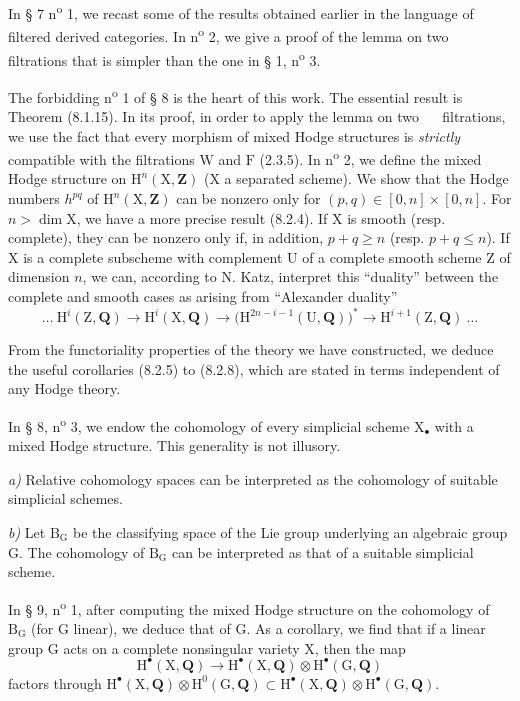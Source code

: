 \documentclass[11pt,leqno]{article}
\newcommand{\Page}[1]{\ifvmode\noindent\else\unskip\ \fi{\footnotesize\textcolor{gray}{[p.\,#1]}}\ \ignorespaces}
\begin{document}
In § 7 n\textsuperscript{o} 1, we recast some of the results obtained earlier in the language of filtered derived categories. In n\textsuperscript{o} 2, we give a proof of the lemma on two filtrations that is simpler than the one in § 1, n\textsuperscript{o} 3.

The forbidding n\textsuperscript{o} 1 of § 8 is the heart of this work. The essential result is Theorem (8.1.15). In its proof, in order to apply the lemma on two
\Page{7}
filtrations, we use the fact that every morphism of mixed Hodge structures is \textit{strictly} compatible with the filtrations \(\mathrm{W}\) and \(\mathrm{F}\) (2.3.5). In n\textsuperscript{o} 2, we define the mixed Hodge structure on \(\mathrm{H}^n(\mathrm{X},\mathbf{Z})\) (\(\mathrm{X}\) a separated scheme). We show that the Hodge numbers \(h^{pq}\) of \(\mathrm{H}^n(\mathrm{X},\mathbf{Z})\) can be nonzero only for \((p,q)\in[0,n]\times[0,n]\). For \(n>\dim\mathrm{X}\), we have a more precise result (8.2.4). If \(\mathrm{X}\) is smooth (resp. complete), they can be nonzero only if, in addition, \(p+q\geq n\) (resp. \(p+q\leq n\)). If \(\mathrm{X}\) is a complete subscheme with complement \(\mathrm{U}\) of a complete smooth scheme \(\mathrm{Z}\) of dimension \(n\), we can, according to N. Katz, interpret this “duality” between the complete and smooth cases as arising from “Alexander duality”
\[
\ldots\ \mathrm{H}^i(\mathrm{Z},\mathbf{Q})
\to \mathrm{H}^i(\mathrm{X},\mathbf{Q})
\to \bigl(\mathrm{H}^{2n-i-1}(\mathrm{U},\mathbf{Q})\bigr)^*
\to \mathrm{H}^{i+1}(\mathrm{Z},\mathbf{Q})\ \ldots
\]

From the functoriality properties of the theory we have constructed, we deduce the useful corollaries (8.2.5) to (8.2.8), which are stated in terms independent of any Hodge theory.

In § 8, n\textsuperscript{o} 3, we endow the cohomology of every simplicial scheme \(\mathrm{X}_{\bullet}\) with a mixed Hodge structure. This generality is not illusory.

\textit{a)} Relative cohomology spaces can be interpreted as the cohomology of suitable simplicial schemes.

\textit{b)} Let \(\mathrm{B}_{\mathrm{G}}\) be the classifying space of the Lie group underlying an algebraic group \(\mathrm{G}\). The cohomology of \(\mathrm{B}_{\mathrm{G}}\) can be interpreted as that of a suitable simplicial scheme.

In § 9, n\textsuperscript{o} 1, after computing the mixed Hodge structure on the cohomology of \(\mathrm{B}_{\mathrm{G}}\) (for \(\mathrm{G}\) linear), we deduce that of \(\mathrm{G}\). As a corollary, we find that if a linear group \(\mathrm{G}\) acts on a complete nonsingular variety \(\mathrm{X}\), then the map
\[
\mathrm{H}^{\bullet}(\mathrm{X},\mathbf{Q})
\to \mathrm{H}^{\bullet}(\mathrm{X},\mathbf{Q})
\otimes \mathrm{H}^{\bullet}(\mathrm{G},\mathbf{Q})
\]
factors through \(\mathrm{H}^{\bullet}(\mathrm{X},\mathbf{Q})\otimes\mathrm{H}^{0}(\mathrm{G},\mathbf{Q})\subset\mathrm{H}^{\bullet}(\mathrm{X},\mathbf{Q})\otimes\mathrm{H}^{\bullet}(\mathrm{G},\mathbf{Q})\).
\end{document}

